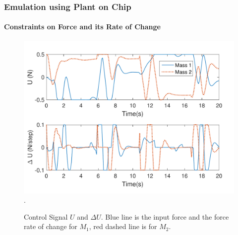 \documentclass{beamer}
\begin{document}
\begin{frame}
\frametitle{Emulation using Plant on Chip}
\framesubtitle{Constraints on Force and its Rate of Change}
\begin{figure}[t]
\centering
\captionsetup{justification=centering}
\includegraphics[scale=.45]{../ASAP_17/figure/MU.pdf}
\DeclareGraphicsExtensions.
\caption{Control Signal $U$ and $\Delta U$. Blue line is the input force and the force rate of change for $M_1$, red dashed line is for $M_2$.\label{fig_mu}}
\end{figure}
\end{frame}

\end{document}
